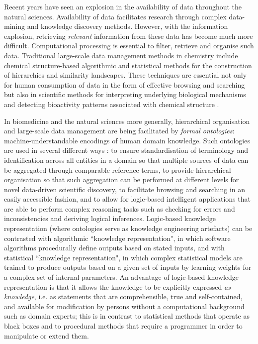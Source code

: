 \documentclass[10pt]{bmc_article}
\newenvironment{bmcformat}{\baselineskip20pt\sloppy\setboolean{publ}{false}}{\baselineskip20pt\sloppy}
\begin{document}
\begin{bmcformat}
Recent years have seen an explosion in the availability of data throughout the natural sciences. Availability of data facilitates research through complex data-mining and knowledge discovery methods. However, with the information explosion, retrieving \textit{relevant} information from these data has become much more difficult. Computational processing is essential to filter, retrieve and organise such data. Traditional large-scale data management methods in chemistry include chemical structure-based algorithmic and statistical methods for the construction of hierarchies and similarity landscapes. These techniques are essential not only for human consumption of data in the form of effective browsing and searching but also in scientific methods for interpreting underlying biological mechanisms and detecting bioactivity patterns associated with chemical structure \cite{cacm2011}. 

In biomedicine and the natural sciences more generally, hierarchical organisation and large-scale data management are being facilitated by \textit{formal ontologies}: machine-understandable encodings of human domain knowledge. Such ontologies are used in several different ways \cite{lambrix2004,courtotsysbio2011,Harland2011940}: to ensure standardisation of terminology and identification across all entities in a domain so that multiple sources of data can be aggregated through comparable reference terms, to provide hierarchical organisation so that such aggregation can be performed at different levels for novel data-driven scientific discovery, to facilitate browsing and searching in an easily accessible fashion, and to allow for logic-based intelligent applications that are able to perform complex reasoning tasks such as checking for errors and inconsistencies and deriving logical inferences. Logic-based knowledge representation (where ontologies serve as knowledge engineering artefacts) can be contrasted with algorithmic ``knowledge representation", in which software algorithms procedurally define outputs based on stated inputs, and with statistical ``knowledge representation", in which complex statistical models are trained to produce outputs based on a given set of inputs by learning weights for a complex set of internal parameters.  An advantage of logic-based knowledge representation is that it allows the knowledge to be explicitly expressed \textit{as knowledge}, i.e. as statements that are comprehensible, true and self-contained, and available for modification by persons without a computational background such as domain experts; this is in contrast to statistical methods that operate as black boxes and to procedural methods that require a programmer in order to manipulate or extend them. 


\end{bmcformat}
\end{document}
